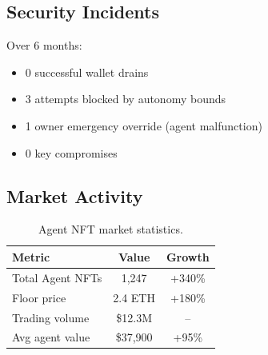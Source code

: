 \subsection{Security Incidents}

Over 6 months:
\begin{itemize}
    \item 0 successful wallet drains
    \item 3 attempts blocked by autonomy bounds
    \item 1 owner emergency override (agent malfunction)
    \item 0 key compromises
\end{itemize}

\subsection{Market Activity}

\begin{table}[t]
\centering
\begin{tabular}{lcc}
\toprule
\textbf{Metric} & \textbf{Value} & \textbf{Growth} \\
\midrule
Total Agent NFTs & 1,247 & +340\% \\
Floor price & 2.4 ETH & +180\% \\
Trading volume & \$12.3M & -- \\
Avg agent value & \$37,900 & +95\% \\
\bottomrule
\end{tabular}
\caption{Agent NFT market statistics.}
\label{tab:market}
\end{table}

